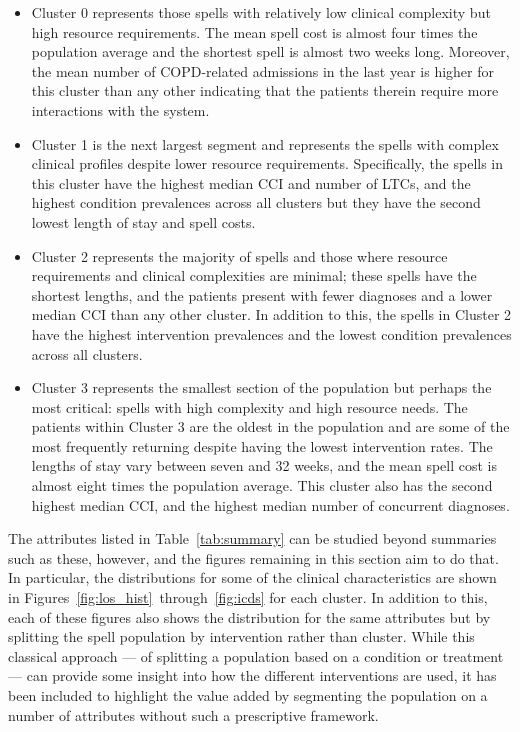 \begin{itemize}
    \item Cluster 0 represents those spells with relatively low clinical
        complexity but high resource requirements. The mean spell cost is almost
        four times the population average and the shortest spell is almost two
        weeks long. Moreover, the mean number of COPD-related admissions in the
        last year is higher for this cluster than any other indicating that the
        patients therein require more interactions with the system.
    \item Cluster 1 is the next largest segment and represents the spells with
        complex clinical profiles despite lower resource requirements.
        Specifically, the spells in this cluster have the highest median CCI and
        number of LTCs, and the highest condition prevalences across all
        clusters but they have the second lowest length of stay and spell costs.
    \item Cluster 2 represents the majority of spells and those where resource
        requirements and clinical complexities are minimal; these spells have
        the shortest lengths, and the patients present with fewer diagnoses and
        a lower median CCI than any other cluster. In addition to this, the
        spells in Cluster 2 have the highest intervention prevalences and the
        lowest condition prevalences across all clusters.
    \item Cluster 3 represents the smallest section of the population but
        perhaps the most critical: spells with high complexity and high resource
        needs. The patients within Cluster 3 are the oldest in the population
        and are some of the most frequently returning despite having the lowest
        intervention rates. The lengths of stay vary between seven and 32 weeks,
        and the mean spell cost is almost eight times the population average.
        This cluster also has the second highest median CCI, and the highest
        median number of concurrent diagnoses.
\end{itemize}

The attributes listed in Table~\ref{tab:summary} can be studied beyond summaries
such as these, however, and the figures remaining in this section aim to do
that. In particular, the distributions for some of the clinical characteristics
are shown in Figures~\ref{fig:los_hist}~through~\ref{fig:icds} for each cluster.
In addition to this, each of these figures also shows the distribution for the
same attributes but by splitting the spell population by intervention rather
than cluster. While this classical approach --- of splitting a population based
on a condition or treatment --- can provide some insight into how the different
interventions are used, it has been included to highlight the value added by
segmenting the population on a number of attributes without such a prescriptive
framework.

